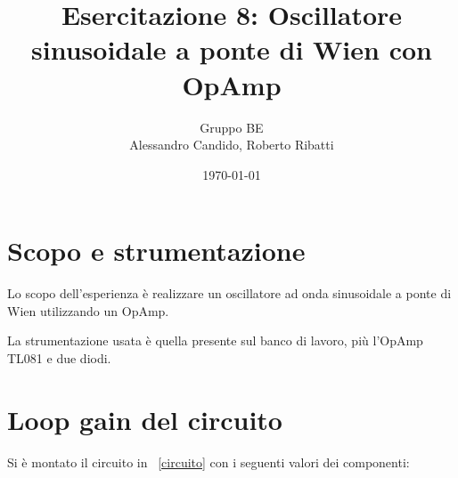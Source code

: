 \documentclass[10pt,a4paper]{article}
\title{Esercitazione 8: Oscillatore sinusoidale a ponte di Wien con OpAmp}
\author{Gruppo BE \\ Alessandro Candido, Roberto Ribatti}
\date{\today}
\begin{document}
\maketitle

\section{Scopo e strumentazione}
Lo scopo dell'esperienza è realizzare un oscillatore ad onda sinusoidale a ponte di Wien utilizzando un OpAmp.

\noindent La strumentazione usata è quella presente sul banco di lavoro, più l'OpAmp TL081 e due diodi.

\section{Loop gain del circuito}
Si è montato il circuito in \figurename{~\ref{circuito}} con i seguenti valori dei componenti:
\end{document}
